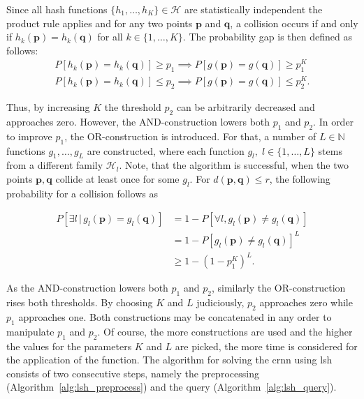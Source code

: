 \documentclass[../../../main.tex]{subfiles}
\begin{document}
Since all hash functions $\{h_1, \dots, h_K\} \in \mathcal{H}$ are statistically independent the product rule applies and for any two points $\bm{p}$ and $\bm{q}$, a collision occurs if and only if $h_k(\bm{p})=h_k(\bm{q})$ for all $k \in \{1, \dots, K\}$. The probability gap is then defined as follows:
\begin{align*}
    P[h_k(\bm{p})=h_k(\bm{q})] \geq p_1 \implies P[g(\bm{p})=g(\bm{q})] \geq p_1^K \\
    P[h_k(\bm{p})=h_k(\bm{q})] \leq p_2 \implies P[g(\bm{p})=g(\bm{q})] \leq p_2^K.
\end{align*}

Thus, by increasing $K$ the threshold $p_2$ can be arbitrarily decreased and approaches zero. However, the AND-construction lowers both $p_1$ and $p_2$. In order to improve $p_1$, the OR-construction is introduced. For that, a number of $L \in \mathbb{N}$ functions $g_1, \dots, g_L$ are constructed, where each function $g_l, \; l \in \{1, \dots, L\}$ stems from a different family $\mathcal{H}_l$. Note, that the algorithm is successful, when the two points $\bm{p}, \bm{q}$ collide at least once for some $g_l$. For $d(\bm{p}, \bm{q}) \leq r$, the following probability for a collision follows as %

\begin{align*}
    P[\exists l \, | \, g_l(\bm{p})=g_l(\bm{q})] &= 1 - P[\forall l, g_l(\bm{p}) \neq g_l(\bm{q})] \\
                                &= 1 - P[g_l(\bm{p}) \neq g_l(\bm{q})]^L \\
                                &\geq 1 - (1-p_1^K)^L.
\end{align*}

As the AND-construction lowers both $p_1$ and $p_2$, similarly the OR-construction rises both thresholds. By choosing $K$ and $L$ judiciously, $p_2$ approaches zero while $p_1$ approaches one. Both constructions may be concatenated in any order to manipulate $p_1$ and $p_2$. Of course, the more constructions are used and the higher the values for the parameters $K$ and $L$ are picked, the more time is considered for the application of the function. The algorithm for solving the \gls{crnn} using \gls{lsh} consists of two consecutive steps, namely the preprocessing (Algorithm~\ref{alg:lsh_preprocess}) and the query (Algorithm~\ref{alg:lsh_query}).
\end{document}
